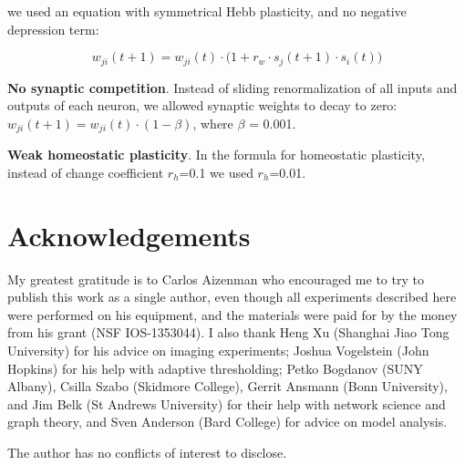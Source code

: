 \documentclass{article}
\begin{document}
we used an equation with symmetrical Hebb plasticity, and no negative depression term: 

\[ w_{ji}(t+1) = w_{ji}(t)\cdot\Big(1+r_w \cdot s_j(t+1) \cdot s_i(t)\Big) \]

\textbf{No synaptic competition}. Instead of sliding renormalization of all inputs and outputs of each neuron, we allowed synaptic weights to decay to zero: $w_{ji}(t+1) = w_{ji}(t)\cdot (1-\beta)$, where $\beta$ = 0.001.

\textbf{Weak homeostatic plasticity}. In the formula for homeostatic plasticity, instead of change coefficient $r_h$=0.1 we used $r_h$=0.01.

\section*{Acknowledgements}

My greatest gratitude is to Carlos Aizenman who encouraged me to try to publish this work as a single author, even though all experiments described here were performed on his equipment, and the materials were paid for by the money from his grant (NSF IOS-1353044). I also thank Heng Xu (Shanghai Jiao Tong University) for his advice on imaging experiments; Joshua Vogelstein (John Hopkins) for his help with adaptive thresholding; Petko Bogdanov (SUNY Albany), Csilla Szabo (Skidmore College), Gerrit Ansmann (Bonn University), and Jim Belk (St Andrews University) for their help with network science and graph theory, and Sven Anderson (Bard College) for advice on model analysis.


The author has no conflicts of interest to disclose.

\nolinenumbers


\end{document}
